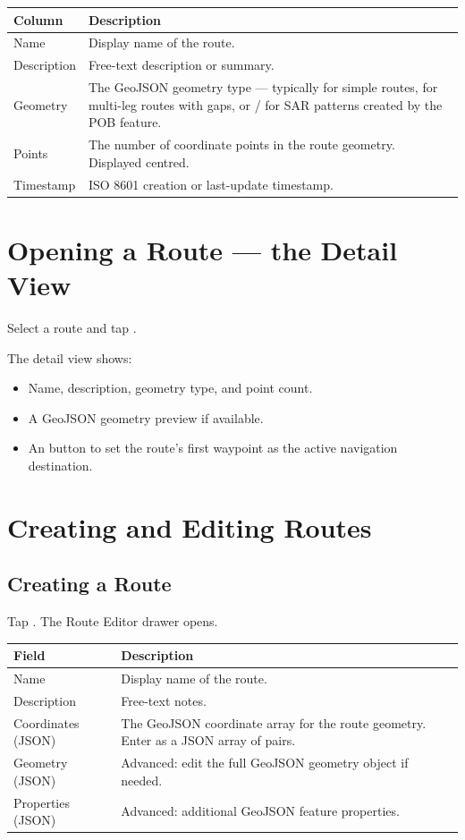 \begin{longtable}{L{2.4cm} L{11.3cm}}
\toprule
{}
{\sffamily\bfseries\color{white} Column} &
{\sffamily\bfseries\color{white} Description} \\
\midrule
Name & Display name of the route. \\
Description & Free-text description or summary. \\
Geometry & The GeoJSON geometry type --- typically  for simple routes,  for multi-leg routes with gaps, or  /  for SAR patterns created by the POB feature. \\
Points & The number of coordinate points in the route geometry. Displayed centred. \\
Timestamp & ISO 8601 creation or last-update timestamp. \\
\bottomrule
\end{longtable}

\section{Opening a Route --- the Detail View}

Select a route and tap .


The detail view shows:
\begin{itemize}
  \item Name, description, geometry type, and point count.
  \item A GeoJSON geometry preview if available.
  \item An  button to set the route's first waypoint as the active navigation destination.
\end{itemize}

\section{Creating and Editing Routes}

\subsection{Creating a Route}

Tap . The Route Editor drawer opens.

\begin{longtable}{L{3cm} L{10.7cm}}
\toprule
{}
{\sffamily\bfseries\color{white} Field} &
{\sffamily\bfseries\color{white} Description} \\
\midrule
Name & Display name of the route. \\
Description & Free-text notes. \\
Coordinates (JSON) & The GeoJSON coordinate array for the route geometry. Enter as a JSON array of  pairs. \\
Geometry (JSON) & Advanced: edit the full GeoJSON geometry object if needed. \\
Properties (JSON) & Advanced: additional GeoJSON feature properties. \\
\bottomrule
\end{longtable}

